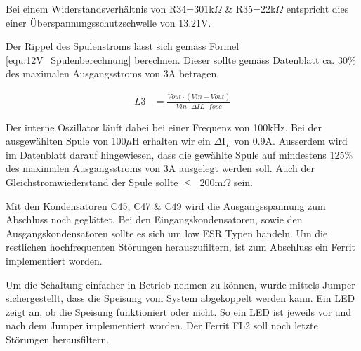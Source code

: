 Bei einem Widerstandsverhältnis von R34=301k$\Omega$ \& R35=22k$\Omega$ entspricht dies einer Überspannungsschutzschwelle von 13.21V. \cite{mouser_mp24943dn-lf_nodate} \cite[S.10]{monolithic_power_systems_mp24943_2011}

Der Rippel des Spulenstroms lässt sich gemäss Formel \ref{equ:12V_Spulenberechnung} berechnen. Dieser sollte gemäss Datenblatt ca. 30\% des maximalen Ausgangsstroms von 3A betragen. \cite[S.10]{monolithic_power_systems_mp24943_2011}

\begin{align}
L3 &= \frac{Vout \cdot (Vin-Vout)}{Vin \cdot \Delta IL \cdot fosc}
\label{equ:12V_Spulenberechnung}
\end{align}

Der interne Oszillator läuft dabei bei einer Frequenz von 100kHz. Bei der ausgewählten Spule von 100$\mu$H erhalten wir ein $\Delta$I$_{L}$ von 0.9A. Ausserdem wird im Datenblatt darauf hingewiesen, dass die gewählte Spule auf mindestens 125\% des maximalen Ausgangsstroms von 3A ausgelegt werden soll. Auch der Gleichstromwiederstand der Spule sollte $ \leq \ $ 200m$\Omega$  sein.\cite[S.8]{monolithic_power_systems_mp24943_2011}  \cite[S.10]{monolithic_power_systems_mp24943_2011}

Mit den Kondensatoren C45, C47 \& C49 wird die Ausgangsspannung zum Abschluss noch geglättet. Bei den Eingangskondensatoren, sowie den Ausgangskondensatoren sollte es sich um low ESR Typen handeln. Um die restlichen hochfrequenten Störungen herauszufiltern, ist zum Abschluss ein Ferrit implementiert worden. 

Um die Schaltung einfacher in Betrieb nehmen zu können, wurde mittels Jumper sichergestellt, dass die Speisung vom System abgekoppelt werden kann. Ein LED zeigt an, ob die Speisung funktioniert oder nicht. So ein LED ist jeweils vor und nach dem Jumper implementiert worden. Der Ferrit FL2 soll noch letzte Störungen herausfiltern.


